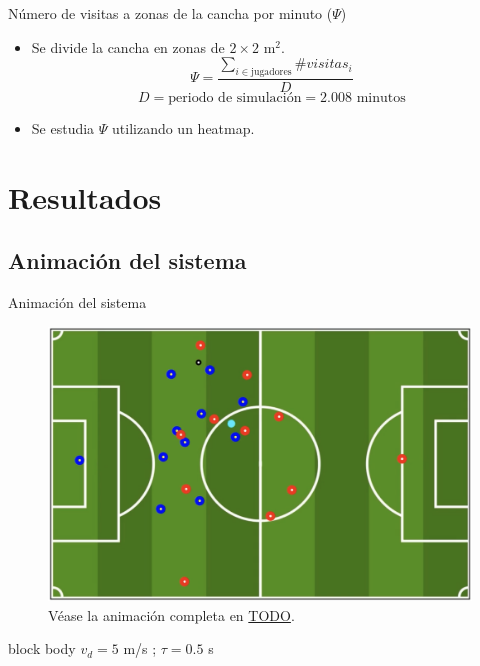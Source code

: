 \documentclass{beamer}
\begin{document}
            \begin{frame}{Número de visitas a zonas de la cancha por minuto ($\Psi$)}
                \begin{itemize}
                    \item Se divide la cancha en zonas de $2 \times 2 \text{ m}^2$.
                    \begin{equation*}
                        \Psi = \frac{\sum_{i \in \text{jugadores}} \#visitas_i}{D}
                    \end{equation*}
                    \begin{equation*}
                        D = \text{periodo de simulación} = 2.008 \text{ minutos}
                    \end{equation*}
                    \item Se estudia $\Psi$ utilizando un \alert{heatmap}.
                \end{itemize}
            \end{frame}

    \section{Resultados}

        \subsection{Animación del sistema}

            \begin{frame}{Animación del sistema}{}
                \vspace*{-0.3cm}
                \begin{figure}[H!]
                    \includegraphics[width=\textwidth]{./animacion_1}
                    \caption*{Véase la animación completa en \url{TODO}.}
                    \label{fig:futbol_1}
                \end{figure}
                \vspace*{-0.5cm}
                \begin{beamercolorbox}[sep=5pt,center]{block body}
                    \centering
                    \small{$v_d = 5$ m/s ; $\tau = 0.5$ s}
                \end{beamercolorbox}
            \end{frame}
\end{document}
